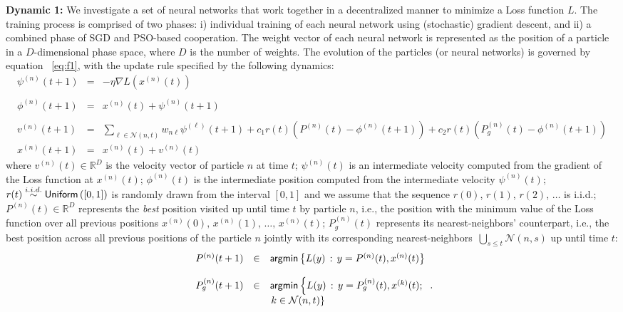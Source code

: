 \documentclass[fleqn,10pt]{wlscirep}
\begin{document}
\textbf{Dynamic 1:}  We investigate a set of neural networks that work together in a decentralized manner to minimize a Loss function $L$. The training process is comprised of two phases: i) individual training of each neural network using (stochastic) gradient descent, and ii) a combined phase of SGD and PSO-based cooperation. The weight vector of each neural network is represented as the position of a particle in a $D$-dimensional phase space, where $D$ is the number of weights. The evolution of the particles (or neural networks) is governed by equation ~\eqref{eq:f1}, with the update rule specified by the following dynamics:
\begin{equation}
\begin{array}{ccl}
\psi^{(n)}(t+1) & = & -\eta \nabla L\left(x^{(n)}(t)\right)\\ 
& & \\
\phi^{(n)}(t+1) & = & x^{(n)}(t)+\psi^{(n)}(t+1)\\
& & \\
v^{(n)}(t+1) \!\!\! & \!\!\! = \!\!\! & \!\!\! \sum\limits_{\ell \in \mathcal{N}(n,t)} w_{n\ell} \psi^{(\ell)}(t+1)
+ c_1 r(t)\left(P^{(n)}(t)-\phi^{(n)}(t+1)\right)
+ c_2 r(t)\left(P_g^{(n)}(t)-\phi^{(n)}(t+1)\right)\\
x^{(n)}(t+1) & = & x^{(n)}(t)+v^{(n)}(t)
\end{array} 
\label{eq:f1}
\end{equation}
where $v^{(n)}(t)\in\mathbb{R}^{D}$ is the velocity vector of particle $n$ at time $t$; $\psi^{(n)}(t)$ is an intermediate velocity computed from the gradient of the Loss function at $x^{(n)}(t)$; $\phi^{(n)}(t)$ is the intermediate position computed from the intermediate velocity $\psi^{(n)}(t)$; $r(t)\overset{i.i.d.}\sim {\sf Uniform}\left(\left[0,1\right]\right)$ is randomly drawn from the interval $\left[0,1\right]$ and we assume that the sequence $r(0)$, $r(1)$, $r(2)$, $\ldots$ is i.i.d.; $P^{(n)}(t)\in\mathbb{R}^D$ represents the \emph{best} position visited up until time $t$ by particle $n$, i.e., the position with the minimum value of the Loss function over all previous positions $x^{(n)}(0),\,x^{(n)}(1),\,\ldots,\,x^{(n)}(t)$; $P_{g}^{(n)}(t)$ represents its nearest-neighbors' counterpart, i.e., the best position across all previous positions of the particle $n$ jointly with its corresponding nearest-neighbors~$\bigcup_{s\leq t} \mathcal{N}\left(n,s\right)$ up until time $t$: 
\begin{equation}\label{eq:PSO}
\begin{array}{ccl}
P^{(n)}(t+1) & \in & {\sf argmin}\left\{L(y)\,:\,y=P^{(n)}(t),x^{(n)}(t)\right\}  \\
& & \\
P_{g}^{(n)}(t+1) & \in & {\sf argmin}\left\{L(y)\,:\,y=P_{g}^{(n)}(t),x^{(k)}(t);\right. \\
& & \left.k\in \mathcal{N}(n,t)\right\} \\
& &\\
\end{array}.
\end{equation}
\end{document}
